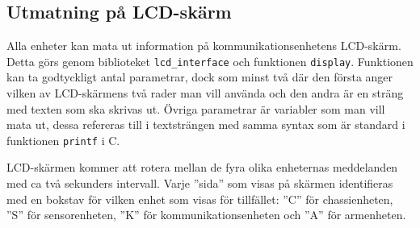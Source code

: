 \subsection{Utmatning på LCD-skärm}
\label{sec:lcd_interface}

Alla enheter kan mata ut information på kommunikationsenhetens LCD-skärm. Detta görs genom biblioteket \verb|lcd_interface| och funktionen \verb|display|. Funktionen kan ta godtyckligt antal parametrar, dock som minst två där den första anger vilken av LCD-skärmens två rader man vill använda och den andra är en sträng med texten som ska skrivas ut. Övriga parametrar är variabler som man vill mata ut, dessa refereras till i textsträngen med samma syntax som är standard i funktionen \verb|printf| i C.

LCD-skärmen kommer att rotera mellan de fyra olika enheternas meddelanden med ca två sekunders intervall. Varje ''sida'' som visas på skärmen identifieras med en bokstav för vilken enhet som visas för tillfället: ''C'' för chassienheten, ''S'' för sensorenheten, ''K'' för kommunikationsenheten och ''A'' för armenheten.
